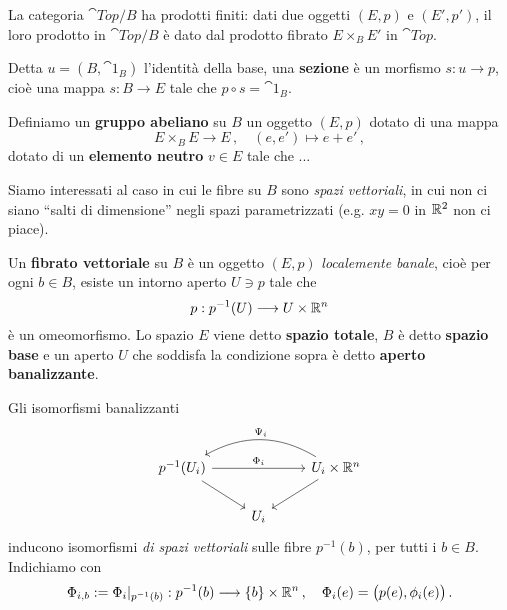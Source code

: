 La categoria $\cat{Top}/B$ ha prodotti finiti: dati due oggetti $(E,p)$
e $(E',p')$, il loro prodotto in $\cat{Top}/B$ è dato dal prodotto fibrato
$E \times_{B} E'$ in $\cat{Top}$.

\begin{df}
	Detta $ u = (B,\cat{1}_{B})$ l'identità della base,
	una \textbf{sezione} è un morfismo $s:u \to p$,
	cioè una mappa $s:B \to E$ tale che $p \circ s = \cat{1}_{B}$.
\end{df}

\begin{df}
	Definiamo un \textbf{gruppo abeliano} su $B$ un oggetto $(E,p)$
	dotato di una mappa
	\begin{equation*}
		E \times_{B} E \longrightarrow E\,, \quad (e,e') \longmapsto e + e'\,,
	\end{equation*}
	dotato di un \textbf{elemento neutro} $v \in E$ tale che ...
\end{df}

Siamo interessati al caso in cui le fibre su $B$ sono \emph{spazi vettoriali},
in cui non ci siano ``salti di dimensione'' negli spazi parametrizzati
(e.g. $xy=0$ in ${\mathbb R}^{2}$ non ci piace).

\begin{df}
	Un \textbf{fibrato vettoriale} su $B$ è un oggetto $(E,p)$ \emph{localemente banale},
	cioè per ogni $b \in B$, esiste un intorno aperto $U \ni p$ tale che
	\begin{equation*}
		p : p^{-1}(U) \longrightarrow U \times {\mathbb R}^{n}
	\end{equation*}
	è un omeomorfismo.
	Lo spazio $E$ viene detto \textbf{spazio totale}, $B$ è detto \textbf{spazio base}
	e un aperto $U$ che soddisfa la condizione sopra è detto
	\textbf{aperto banalizzante}.
\end{df}

Gli isomorfismi banalizzanti
\begin{equation*}
	\begin{tikzcd}
		p^{-1}(U_{i}) \ar[rr, "\Phi_{i}"] \ar[dr] 
		& & U_{i} \times \R^{n} \ar[dl] \ar[ll, bend right, "\Psi_{i}"'] \\
		& U_{i} &
	\end{tikzcd}
\end{equation*}
inducono isomorfismi \emph{di spazi vettoriali} sulle fibre $p^{-1}(b)$, per tutti i $b \in B$.
Indichiamo con
\begin{equation*}
	\Phi_{i,b} := \Phi_{i}\vert_{p^{-1}(b)} : p^{-1}(b) \longrightarrow \{b\} \times \R^{n}\,,
	\quad \Phi_{i}(e) = \big( p(e), \phi_{i}(e) \big)\,.
\end{equation*}

